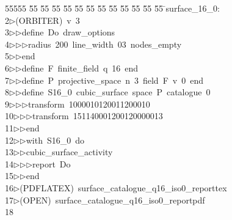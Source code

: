 %
%
\begin{tabbing}
55555 \= 55 \= 55 \= 55 \= 55 \= 55 \= 55 \= 55 \= 55 \= 55 \= 55 \= 55 \= 55 \= \>surface\_16\_0:\\[0pt]
2\>$\triangleright$\>(ORBITER)\ v\ 3\ \\[0pt]
3\>$\triangleright$\>$\triangleright$\>define\ Do\ draw\_options\ \\[0pt]
4\>$\triangleright$\>$\triangleright$\>$\triangleright$\>radius\ 200\ line\_width\ 03\ nodes\_empty\ \\[0pt]
5\>$\triangleright$\>$\triangleright$\>end\ \\[0pt]
6\>$\triangleright$\>$\triangleright$\>define\ F\ finite\_field\ q\ 16\ end\ \\[0pt]
7\>$\triangleright$\>$\triangleright$\>define\ P\ projective\_space\ n\ 3\ field\ F\ v\ 0\ end\ \\[0pt]
8\>$\triangleright$\>$\triangleright$\>define\ S16\_0\ cubic\_surface\ space\ P\ catalogue\ 0\ \\[0pt]
9\>$\triangleright$\>$\triangleright$\>$\triangleright$\>transform\ 1000010120011200010\ \\[0pt]
10\>$\triangleright$\>$\triangleright$\>$\triangleright$\>transform\ 151140001200120000013\ \\[0pt]
11\>$\triangleright$\>$\triangleright$\>end\ \\[0pt]
12\>$\triangleright$\>$\triangleright$\>with\ S16\_0\ do\ \\[0pt]
13\>$\triangleright$\>$\triangleright$\>cubic\_surface\_activity\ \\[0pt]
14\>$\triangleright$\>$\triangleright$\>$\triangleright$\>report\ Do\ \\[0pt]
15\>$\triangleright$\>$\triangleright$\>end\\[0pt]
16\>$\triangleright$\>(PDFLATEX)\ surface\_catalogue\_q16\_iso0\_reporttex\\[0pt]
17\>$\triangleright$\>(OPEN)\ surface\_catalogue\_q16\_iso0\_reportpdf\\[0pt]
18\>\end{tabbing}

